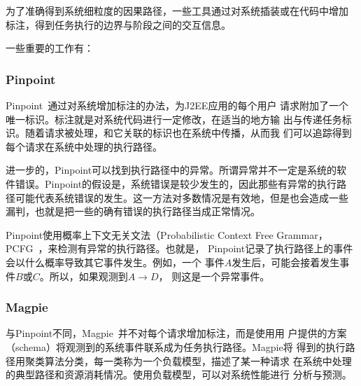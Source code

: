 为了准确得到系统细粒度的因果路径，一些工具通过对系统插装或在代码中增加
标注，得到任务执行的边界与阶段之间的交互信息。

一些重要的工作有：

% 
% 
% 
% 
% 


\subsubsection*{Pinpoint}


Pinpoint~\cite{pinpoint}通过对系统增加标注的办法，为J2EE应用的每个用户
请求附加了一个唯一标识。标注就是对系统代码进行一定修改，在适当的地方输
出与传递任务标识。随着请求被处理，和它关联的标识也在系统中传播，从而我
们可以追踪得到每个请求在系统中处理的执行路径。

进一步的，Pinpoint可以找到执行路径中的异常。所谓异常并不一定是系统的软
件错误。Pinpoint的假设是，系统错误是较少发生的，因此那些有异常的执行路
径可能代表系统错误的发生。这一方法对多数情况是有效地，但是也会造成一些
漏判，也就是把一些的确有错误的执行路径当成正常情况。

Pinpoint使用概率上下文无关文法（Probabilistic Context Free
Grammar，PCFG~\cite{Manning1999}，来检测有异常的执行路径。也就是，
Pinpoint记录了执行路径上的事件会以什么概率导致其它事件发生。例如，一个
事件$A$发生后，可能会接着发生事件$B$或$C$。所以，如果观测到$A \to D$，
则这是一个异常事件。

\subsubsection*{Magpie}

与Pinpoint不同，Magpie~\cite{magpie}并不对每个请求增加标注，而是使用用
户提供的方案（schema）将观测到的系统事件联系成为任务执行路径。Magpie将
得到的执行路径用聚类算法分类，每一类称为一个负载模型，描述了某一种请求
在系统中处理的典型路径和资源消耗情况。使用负载模型，可以对系统性能进行
分析与预测。

